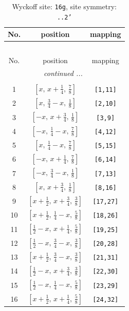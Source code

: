 \documentclass[fleqn,8pt]{jsarticle}
\begin{document}
\renewcommand{\arraystretch}{1.2}
\begin{longtable}{ccc}
\caption{Wyckoff site: {\tt 16g}, site symmetry: {\tt ..2'}}
 \\
 \hline \hline
No. & position & mapping \\ \hline \endfirsthead

\multicolumn{2}{l}{\tablename\ \thetable{}} \\
 \hline \hline
No. & position & mapping \\ \hline \endhead

 \hline \hline
\multicolumn{2}{r}{\footnotesize\it continued ...} \\ \endfoot

 \hline \hline
\multicolumn{2}{r}{} \\ \endlastfoot

1 & $\left[ x,\, x + \frac{1}{4},\, \frac{7}{8} \right]$ & {\tt [1,11]} \\ \hline
2 & $\left[ x,\, \frac{3}{4} - x,\, \frac{1}{8} \right]$ & {\tt [2,10]} \\ \hline
3 & $\left[ - x,\, x + \frac{3}{4},\, \frac{1}{8} \right]$ & {\tt [3,9]} \\ \hline
4 & $\left[ - x,\, \frac{1}{4} - x,\, \frac{7}{8} \right]$ & {\tt [4,12]} \\ \hline
5 & $\left[ x,\, \frac{1}{4} - x,\, \frac{7}{8} \right]$ & {\tt [5,15]} \\ \hline
6 & $\left[ - x,\, x + \frac{1}{4},\, \frac{7}{8} \right]$ & {\tt [6,14]} \\ \hline
7 & $\left[ - x,\, \frac{3}{4} - x,\, \frac{1}{8} \right]$ & {\tt [7,13]} \\ \hline
8 & $\left[ x,\, x + \frac{3}{4},\, \frac{1}{8} \right]$ & {\tt [8,16]} \\ \hline
9 & $\left[ x + \frac{1}{2},\, x + \frac{3}{4},\, \frac{3}{8} \right]$ & {\tt [17,27]} \\ \hline
10 & $\left[ x + \frac{1}{2},\, \frac{1}{4} - x,\, \frac{5}{8} \right]$ & {\tt [18,26]} \\ \hline
11 & $\left[ \frac{1}{2} - x,\, x + \frac{1}{4},\, \frac{5}{8} \right]$ & {\tt [19,25]} \\ \hline
12 & $\left[ \frac{1}{2} - x,\, \frac{3}{4} - x,\, \frac{3}{8} \right]$ & {\tt [20,28]} \\ \hline
13 & $\left[ x + \frac{1}{2},\, \frac{3}{4} - x,\, \frac{3}{8} \right]$ & {\tt [21,31]} \\ \hline
14 & $\left[ \frac{1}{2} - x,\, x + \frac{3}{4},\, \frac{3}{8} \right]$ & {\tt [22,30]} \\ \hline
15 & $\left[ \frac{1}{2} - x,\, \frac{1}{4} - x,\, \frac{5}{8} \right]$ & {\tt [23,29]} \\ \hline
16 & $\left[ x + \frac{1}{2},\, x + \frac{1}{4},\, \frac{5}{8} \right]$ & {\tt [24,32]} \\
\end{longtable}
\end{document}
